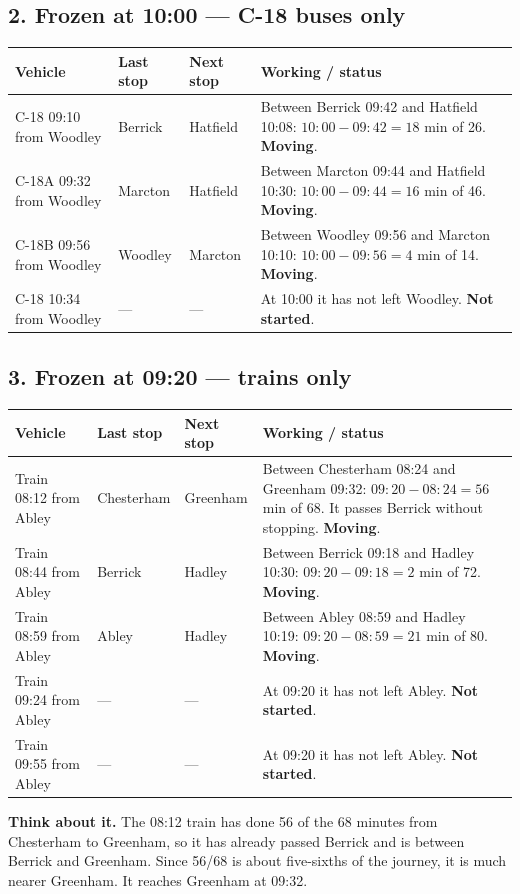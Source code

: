 \documentclass[11pt,a4paper]{article}
\newcommand{\ans}[1]{\textcolor{red!75!black}{\textbf{#1}}}
\begin{document}
\subsection*{2. Frozen at 10:00 --- C-18 buses only}
\begin{tabularx}{\linewidth}{@{}l l l X@{}}
\toprule
Vehicle & Last stop & Next stop & Working / status\\
\midrule
C-18 09:10 from Woodley & Berrick & Hatfield & Between Berrick 09:42 and Hatfield 10:08: \(10{:}00-09{:}42=18\) min of 26. \ans{Moving}.\\
C-18A 09:32 from Woodley & Marcton & Hatfield & Between Marcton 09:44 and Hatfield 10:30: \(10{:}00-09{:}44=16\) min of 46. \ans{Moving}.\\
C-18B 09:56 from Woodley & Woodley & Marcton & Between Woodley 09:56 and Marcton 10:10: \(10{:}00-09{:}56=4\) min of 14. \ans{Moving}.\\
C-18 10:34 from Woodley & --- & --- & At 10:00 it has not left Woodley. \ans{Not started}.\\
\bottomrule
\end{tabularx}

\subsection*{3. Frozen at 09:20 --- trains only}
\begin{tabularx}{\linewidth}{@{}l l l X@{}}
\toprule
Vehicle & Last stop & Next stop & Working / status\\
\midrule
Train 08:12 from Abley & Chesterham & Greenham & Between Chesterham 08:24 and Greenham 09:32: \(09{:}20-08{:}24=56\) min of 68. It passes Berrick without stopping. \ans{Moving}.\\
Train 08:44 from Abley & Berrick & Hadley & Between Berrick 09:18 and Hadley 10:30: \(09{:}20-09{:}18=2\) min of 72. \ans{Moving}.\\
Train 08:59 from Abley & Abley & Hadley & Between Abley 08:59 and Hadley 10:19: \(09{:}20-08{:}59=21\) min of 80. \ans{Moving}.\\
Train 09:24 from Abley & --- & --- & At 09:20 it has not left Abley. \ans{Not started}.\\
Train 09:55 from Abley & --- & --- & At 09:20 it has not left Abley. \ans{Not started}.\\
\bottomrule
\end{tabularx}

\textbf{Think about it.} The 08:12 train has done 56 of the 68 minutes from Chesterham to Greenham, so it has already passed Berrick and is between Berrick and Greenham. Since 56/68 is about five-sixths of the journey, it is much nearer Greenham. It reaches Greenham at 09:32.
\end{document}
